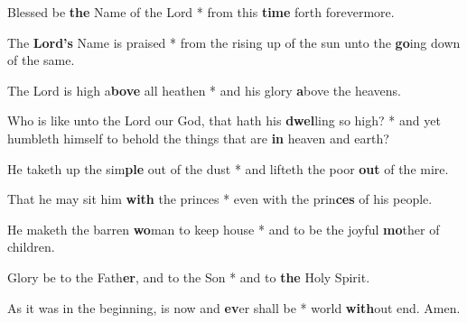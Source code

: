 \begin{multicols}{2}
	Blessed be \textbf{the} Name of the Lord * from this \textbf{time} forth forevermore.
	
	The \textbf{Lord's} Name is praised * from the rising up of the sun unto the \textbf{go}ing down of the same.
	
	The Lord is high a\textbf{bove} all heathen * and his glory \textbf{a}bove the heavens.
	
	Who is like unto the Lord our God, that hath his \textbf{dwel}ling so high? * and yet humbleth himself to behold the things that are \textbf{in} heaven and earth?
	
	He taketh up the sim\textbf{ple} out of the dust * and lifteth the poor \textbf{out} of the mire.
	
	That he may sit him \textbf{with} the princes * even with the prin\textbf{ces} of his people.
	
	He maketh the barren \textbf{wo}man to keep house * and to be the joyful \textbf{mo}ther of children.
	
	Glory be to the Fath\textbf{er}, and to the Son * and to \textbf{the} Holy Spirit.
	
	As it was in the beginning, is now and \textbf{ev}er shall be * world \textbf{with}out end. Amen.
\end{multicols}